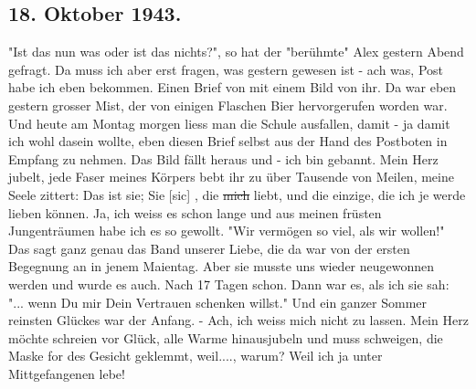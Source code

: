 \subsection{18. Oktober 1943.}

"Ist das nun was oder ist das nichts?", so hat der "ber\"{u}hmte" Alex gestern Abend gefragt.
Da muss ich aber erst fragen, was gestern gewesen ist - ach was, Post habe ich eben bekommen.
Einen Brief von mit einem Bild von ihr.
Da war eben gestern grosser Mist, der von einigen Flaschen Bier hervorgerufen worden war.
Und heute am Montag morgen liess man die Schule ausfallen, damit - ja damit ich wohl dasein wollte, eben diesen Brief selbst aus der Hand des Postboten in Empfang zu nehmen.
Das Bild f\"{a}llt heraus und - ich bin gebannt.
Mein Herz jubelt, jede Faser meines K\"{o}rpers bebt ihr zu \"{u}ber Tausende von Meilen, meine Seele zittert: Das ist sie; Sie{\color{red} [sic] }, die \st{mich} liebt, und die einzige, die ich je werde lieben k\"{o}nnen.
Ja, ich weiss es schon lange und aus meinen fr\"{u}sten Jungentr\"{a}umen habe ich es so gewollt.
"Wir verm\"{o}gen so viel, als wir wollen!"
Das sagt ganz genau das Band unserer Liebe, die da war von der ersten Begegnung an in jenem Maientag.
Aber sie musste uns wieder neugewonnen werden und wurde es auch.
Nach 17 Tagen schon.
Dann war es, als ich sie sah: "... wenn Du mir Dein Vertrauen schenken willst."
Und ein ganzer Sommer reinsten Gl\"{u}ckes war der Anfang.
- Ach, ich weiss mich nicht zu lassen.
Mein Herz m\"{o}chte schreien vor Gl\"{u}ck, alle Warme hinausjubeln und muss schweigen, die Maske for des Gesicht geklemmt, weil...., warum?
Weil ich ja unter Mittgefangenen lebe!

\clearpage
